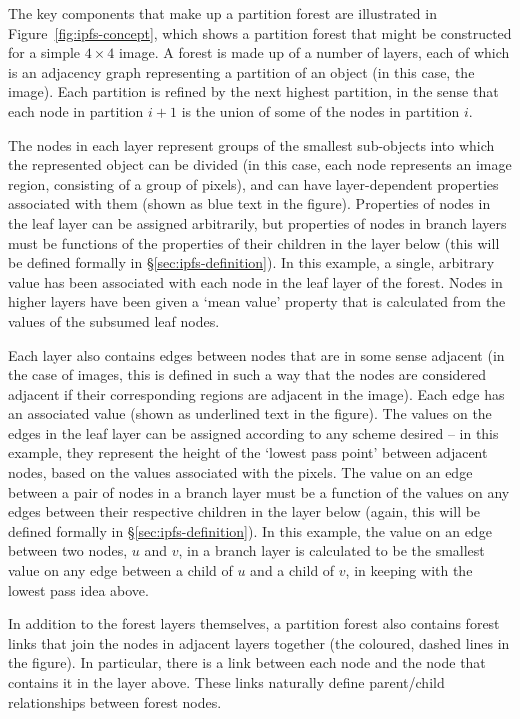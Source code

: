 \newpage

The key components that make up a partition forest are illustrated in Figure~\ref{fig:ipfs-concept}, which shows a partition forest that might be constructed for a simple $4 \times 4$ image. A forest is made up of a number of layers, each of which is an adjacency graph representing a partition of an object (in this case, the image). Each partition is refined by the next highest partition, in the sense that each node in partition $i+1$ is the union of some of the nodes in partition $i$.

The nodes in each layer represent groups of the smallest sub-objects into which the represented object can be divided (in this case, each node represents an image region, consisting of a group of pixels), and can have layer-dependent properties associated with them (shown as blue text in the figure). Properties of nodes in the leaf layer can be assigned arbitrarily, but properties of nodes in branch layers must be functions of the properties of their children in the layer below (this will be defined formally in \S\ref{sec:ipfs-definition}). In this example, a single, arbitrary value has been associated with each node in the leaf layer of the forest. Nodes in higher layers have been given a `mean value' property that is calculated from the values of the subsumed leaf nodes.

Each layer also contains edges between nodes that are in some sense adjacent (in the case of images, this is defined in such a way that the nodes are considered adjacent if their corresponding regions are adjacent in the image). Each edge has an associated value (shown as underlined text in the figure). The values on the edges in the leaf layer can be assigned according to any scheme desired -- in this example, they represent the height of the `lowest pass point' between adjacent nodes, based on the values associated with the pixels. The value on an edge between a pair of nodes in a branch layer must be a function of the values on any edges between their respective children in the layer below (again, this will be defined formally in \S\ref{sec:ipfs-definition}). In this example, the value on an edge between two nodes, $u$ and $v$, in a branch layer is calculated to be the smallest value on any edge between a child of $u$ and a child of $v$, in keeping with the lowest pass idea above.

In addition to the forest layers themselves, a partition forest also contains forest links that join the nodes in adjacent layers together (the coloured, dashed lines in the figure). In particular, there is a link between each node and the node that contains it in the layer above. These links naturally define parent/child relationships between forest nodes.

